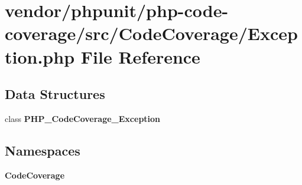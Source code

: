 \section{vendor/phpunit/php-\/code-\/coverage/src/\+Code\+Coverage/\+Exception.php File Reference}
\label{phpunit_2php-code-coverage_2src_2_code_coverage_2_exception_8php}
\subsection*{Data Structures}
\begin{DoxyCompactItemize}
\item 
class {\bf P\+H\+P\+\_\+\+Code\+Coverage\+\_\+\+Exception}
\end{DoxyCompactItemize}
\subsection*{Namespaces}
\begin{DoxyCompactItemize}
\item 
 {\bf Code\+Coverage}
\end{DoxyCompactItemize}
